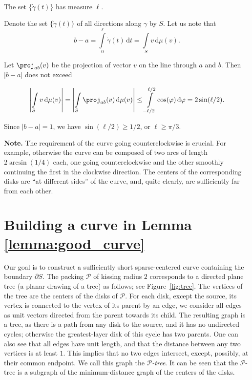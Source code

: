 \begin{corollary}
The set $\{\dot{\gamma}(t)\}$ has measure $\ell$.
\end{corollary}

Denote the set $\{\dot{\gamma}(t)\}$ of all directions along $\gamma$ by $S$. Let us note that $$b - a = \int\limits_0^{\ell}\dot{\gamma}(t)\,\mathrm{d}t = \int\limits_Sv\,\mathrm{d}\mu(v).$$

Let $\proj_{ab}(v)$ be the projection of vector $v$ on the line through $a$ and $b$. Then $|b - a|$ does not exceed

$$\left|\int\limits_Sv\,\mathrm{d}\mu(v)\right| = \left|\int\limits_S\proj_{ab}(v)\,\mathrm{d}\mu(v)\right| \leq \int\limits_{-\ell/2}^{\ell/2}\cos(\varphi)\,\mathrm{d}\varphi = 2\sin(\ell/2).$$

Since $|b - a| = 1$, we have $\sin(\ell/2)\geq 1/2$, or $\ell\geq\pi/3$.

\textbf{Note.} The requirement of the curve going counterclockwise is crucial. For example, otherwise the curve can be composed of two arcs of length $2\arcsin(1/4)$ each, one going counterclockwise and the other smoothly continuing the first in the clockwise direction. The centers of the corresponding disks are ``at different sides'' of the curve, and, quite clearly, are sufficiently far from each other.

\section{Building a curve in Lemma \ref{lemma:good_curve}}

Our goal is to construct a sufficiently short sparse-centered curve containing the boundary $\partial S$. The packing $\mathcal{P}$ of kissing radius $2$ corresponds to a directed plane tree (a planar drawing of a tree) as follows; see Figure~\ref{fig:tree}. The vertices of the tree are the centers of the disks of $\mathcal{P}$. For each disk, except the source, its vertex is connected to the vertex of its parent by an edge, we consider all edges as unit vectors directed from the parent towards its child. The resulting graph is a tree, as there is a path from any disk to the source, and it has no undirected cycles; otherwise the greatest-layer disk of this cycle has two parents. One can also see that all edges have unit length, and that the distance between any two vertices is at least $1$. This implies that no two edges intersect, except, possibly, at their common endpoint. We call this graph the \textit{$\mathcal{P}$-tree}. It can be seen that the $\mathcal{P}$-tree is a subgraph of the minimum-distance graph of the centers of the disks.

